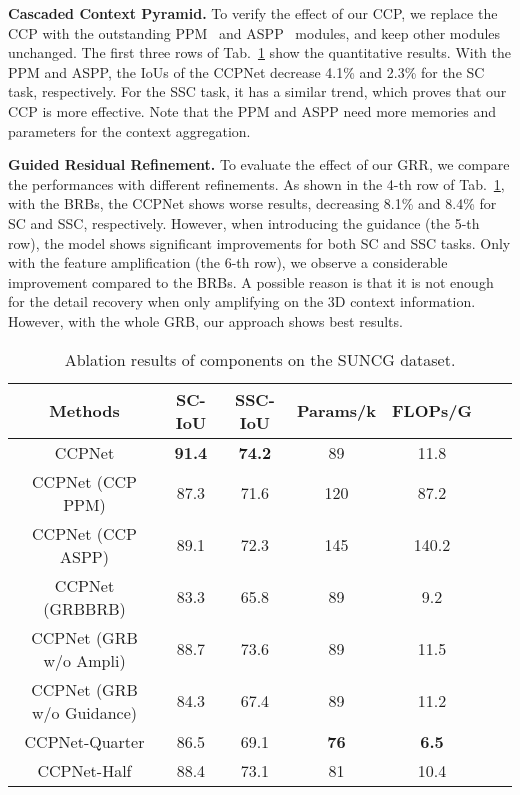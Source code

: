 \documentclass[10pt,twocolumn,letterpaper]{article}
\begin{document}
\textbf{Cascaded Context Pyramid.}
To verify the effect of our CCP, we replace the CCP with the outstanding PPM~\cite{zhao2017pyramid} and ASPP~\cite{chen2018deeplab} modules, and keep other modules unchanged.
The first three rows of Tab.~\ref{table:abs} show the quantitative results.
With the PPM and ASPP, the IoUs of the CCPNet decrease 4.1\% and 2.3\% for the SC task, respectively.
For the SSC task, it has a similar trend, which proves that our CCP is more effective.
Note that the PPM and ASPP need more memories and parameters for the context aggregation.

\textbf{Guided Residual Refinement.}
To evaluate the effect of our GRR, we compare the performances with different refinements.
As shown in the 4-th row of Tab.~\ref{table:abs}, with the BRBs, the CCPNet shows worse results, decreasing 8.1\% and 8.4\% for SC and SSC, respectively.
However, when introducing the guidance (the 5-th row), the model shows significant improvements for both SC and SSC tasks.
Only with the feature amplification (the 6-th row), we observe a considerable improvement compared to the BRBs.
A possible reason is that it is not enough for the detail recovery when only amplifying on the 3D context information. However, with the whole GRB, our approach shows best results.
\begin{table}
\begin{center}
\doublerulesep=0.5pt
\resizebox{0.48\textwidth}{!}
{
\begin{tabular}{|c|c|c|c|c|c|c|}
\hline
Methods &SC-IoU&SSC-IoU&Params/k&FLOPs/G\\
\hline
\hline
CCPNet&\textbf{91.4} & \textbf{74.2}&89 & 11.8 \\
CCPNet (CCP PPM)&87.3&71.6&120&87.2\\
CCPNet (CCP ASPP)&89.1&72.3&145&140.2\\
\hline
CCPNet (GRBBRB)&83.3&65.8&89 & 9.2\\
CCPNet (GRB w/o Ampli)&88.7& 73.6&89 &11.5 \\
CCPNet (GRB w/o Guidance)&84.3&67.4&89 &11.2 \\
\hline
CCPNet-Quarter &86.5&69.1&\textbf{76}& \textbf{6.5}\\
CCPNet-Half&88.4&73.1&81& 10.4\\
\hline
\end{tabular}
}
\caption{Ablation results of components on the SUNCG dataset.}
\label{table:abs}
\vspace{-6mm}
\end{center}
\end{table}
\end{document}
